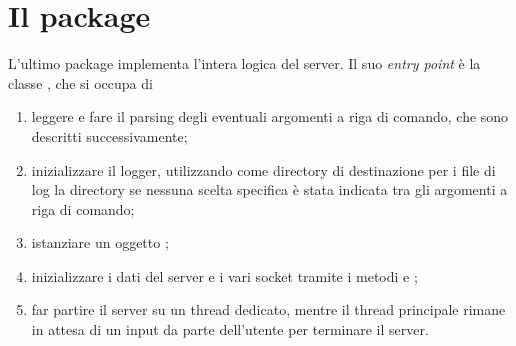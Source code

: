 \documentclass[
    oneside,
    10pt,
    language=italian,
    a4paper,
    article
]{notes}
\begin{document}
\section{Il package } \label{sec:server}
L'ultimo package implementa l'intera logica del server. Il suo \emph{entry point}
è la classe , che si occupa di
\begin{enumerate}
    \item leggere e fare il parsing degli eventuali argomenti a riga di comando, 
        che sono descritti successivamente;
    \item inizializzare il logger, utilizzando come directory di destinazione per
        i file di log la directory  se nessuna scelta specifica è 
        stata indicata tra gli argomenti a riga di comando;
    \item istanziare un oggetto ;
    \item inizializzare i dati del server e i vari socket tramite i metodi
         e ;
    \item far partire il server su un thread dedicato, mentre il thread principale
        rimane in attesa di un input da parte dell'utente per terminare il server.
\end{enumerate}
\end{document}
